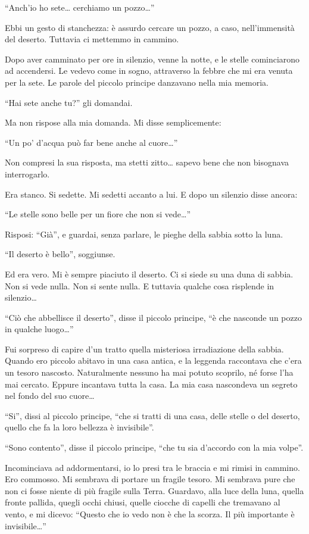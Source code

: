 \documentclass[11pt]{scrbook}
\begin{document}
``Anch'io ho sete\ldots{} cerchiamo un pozzo\ldots{}''

Ebbi un gesto di stanchezza: è assurdo cercare un pozzo, a caso, nell'immensità del deserto. Tuttavia ci mettemmo in cammino.

Dopo aver camminato per ore in silenzio, venne la notte, e le stelle cominciarono ad accendersi. Le vedevo come in sogno, attraverso la febbre che mi era venuta per la sete. Le parole del piccolo principe danzavano nella mia memoria.

``Hai sete anche tu?'' gli domandai.

Ma non rispose alla mia domanda. Mi disse semplicemente:

``Un po' d'acqua può far bene anche al cuore\ldots{}''

Non compresi la sua risposta, ma stetti zitto\ldots{} sapevo bene che non bisognava interrogarlo.

Era stanco. Si sedette. Mi sedetti accanto a lui. E dopo un silenzio disse ancora:

``Le stelle sono belle per un fiore che non si vede\ldots{}''

Risposi: ``Già'', e guardai, senza parlare, le pieghe della sabbia sotto la luna.

``Il deserto è bello'', soggiunse.

Ed era vero. Mi è sempre piaciuto il deserto. Ci si siede su una duna di sabbia. Non si vede nulla. Non si sente nulla. E tuttavia qualche cosa risplende in silenzio\ldots{}

``Ciò che abbellisce il deserto'', disse il piccolo principe, ``è che nasconde un pozzo in qualche luogo\ldots{}''

Fui sorpreso di capire d'un tratto quella misteriosa irradiazione della sabbia. Quando ero piccolo abitavo in una casa antica, e la leggenda raccontava che c'era un tesoro nascosto. Naturalmente nessuno ha mai potuto scoprilo, né forse l'ha mai cercato. Eppure incantava tutta la casa. La mia casa nascondeva un segreto nel fondo del suo cuore\ldots{}

``Si'', dissi al piccolo principe, ``che si tratti di una casa, delle stelle o del deserto, quello che fa la loro bellezza è invisibile''.

``Sono contento'', disse il piccolo principe, ``che tu sia d'accordo con la mia volpe''.

Incominciava ad addormentarsi, io lo presi tra le braccia e mi rimisi in cammino. Ero commosso. Mi sembrava di portare un fragile tesoro. Mi sembrava pure che non ci fosse niente di più fragile sulla Terra. Guardavo, alla luce della luna, quella fronte pallida, quegli occhi chiusi, quelle ciocche di capelli che tremavano al vento, e mi dicevo: ``Questo che io vedo non è che la scorza. Il più importante è invisibile\ldots{}''
\end{document}

